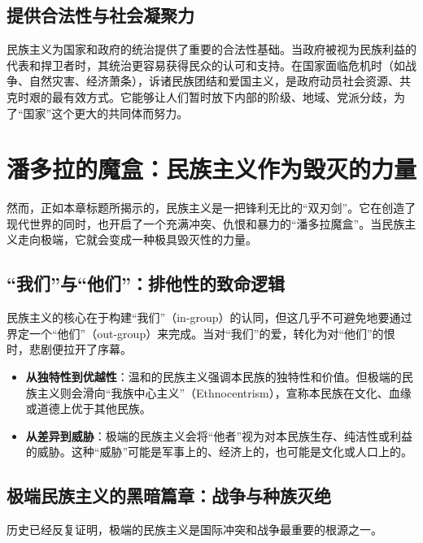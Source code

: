 \subsection{ 提供合法性与社会凝聚力}

民族主义为国家和政府的统治提供了重要的合法性基础。当政府被视为民族利益的代表和捍卫者时，其统治更容易获得民众的认可和支持。在国家面临危机时（如战争、自然灾害、经济萧条），诉诸民族团结和爱国主义，是政府动员社会资源、共克时艰的最有效方式。它能够让人们暂时放下内部的阶级、地域、党派分歧，为了“国家”这个更大的共同体而努力。

\hrulefill

\section{潘多拉的魔盒：民族主义作为毁灭的力量}

然而，正如本章标题所揭示的，民族主义是一把锋利无比的“双刃剑”。它在创造了现代世界的同时，也开启了一个充满冲突、仇恨和暴力的“潘多拉魔盒”。当民族主义走向极端，它就会变成一种极具毁灭性的力量。

\subsection{“我们”与“他们”：排他性的致命逻辑}

民族主义的核心在于构建“我们”（in-group）的认同，但这几乎不可避免地要通过界定一个“他们”（out-group）来完成。当对“我们”的爱，转化为对“他们”的恨时，悲剧便拉开了序幕。

\begin{itemize}[noitemsep,topsep=0pt]
    \item \textbf{从独特性到优越性}：温和的民族主义强调本民族的独特性和价值。但极端的民族主义则会滑向“我族中心主义”（Ethnocentrism），宣称本民族在文化、血缘或道德上优于其他民族。
    \item \textbf{从差异到威胁}：极端的民族主义会将“他者”视为对本民族生存、纯洁性或利益的威胁。这种“威胁”可能是军事上的、经济上的，也可能是文化或人口上的。
\end{itemize}

\subsection{极端民族主义的黑暗篇章：战争与种族灭绝}

历史已经反复证明，极端的民族主义是国际冲突和战争最重要的根源之一。

